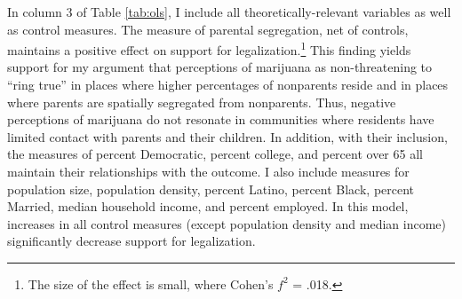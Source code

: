 In column 3 of Table \ref{tab:ols}, I include all theoretically-relevant variables as well as control measures. The measure of parental segregation, net of controls, maintains a positive effect on support for legalization.\footnote{The size of the effect is small, where Cohen's $f^{2}$ = .018.} This finding yields support for my argument that perceptions of marijuana as non-threatening to ``ring true'' in places where higher percentages of nonparents reside and in places where parents are spatially segregated from nonparents. Thus, negative perceptions of marijuana do not resonate in communities where residents have limited contact with parents and their children. In addition, with their inclusion, the measures of percent Democratic, percent college, and percent over 65 all maintain their relationships with the outcome. I also include measures for population size, population density, percent Latino, percent Black, percent Married, median household income, and percent employed. In this model, increases in all control measures (except population density and median income) significantly decrease support for legalization. 

\begin{center}
%

\end{center}

\vspace{-50pt}

